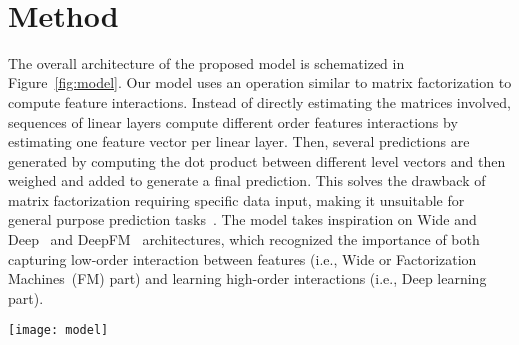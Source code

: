 \documentclass[manuscript,nonacm]{acmart}
\begin{document}
\vspace{-0.95cm}

\begin{figure*}
    \centering

    ~
    \vspace{-0.2cm}

    \caption{Kernel Density Estimation of feature  before and after transformation}
    \label{fig:feature-transformation}\vspace{-0.5cm}
\end{figure*}

\section{Method}\label{sec:model}

The overall architecture of the proposed model is schematized in Figure~\ref{fig:model}. Our model uses an operation similar to matrix factorization to compute feature interactions. Instead of directly estimating the matrices involved, sequences of linear layers compute different order features interactions by estimating one feature vector per linear layer. Then, several predictions are generated by computing the dot product between different level vectors and then weighed and added to generate a final prediction. This solves the drawback of matrix factorization requiring specific data input, making it unsuitable for general purpose prediction tasks~\cite{fm2010}. The model takes inspiration on Wide and Deep~\cite{wdlrs16} and DeepFM~\cite{deepfm17} architectures, which recognized the importance of both capturing low-order interaction between features (i.e., Wide or Factorization Machines~(FM) part) and learning high-order interactions (i.e., Deep learning part).

\begin{figure*}
     \centering
    \texttt{[image: model]}\vspace{-0.2cm}
    \caption{Schematic diagram of the proposed model}
    \label{fig:model}\vspace{-0.54cm}
\end{figure*}
\end{document}
